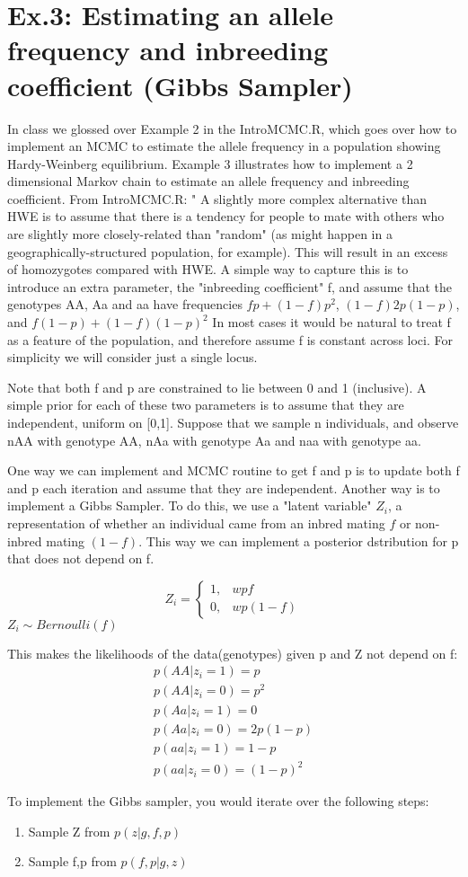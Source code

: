 \documentclass[12pt]{report}
\begin{document}
\section{Ex.3: Estimating an allele frequency and inbreeding coefficient (Gibbs Sampler)}
In class we glossed over Example 2 in the IntroMCMC.R, which goes over how to implement an MCMC to estimate the allele frequency in a population showing Hardy-Weinberg equilibrium.
Example 3 illustrates how to implement a 2 dimensional Markov chain to estimate an allele frequency and inbreeding coefficient.
From IntroMCMC.R:
" A slightly more complex alternative than HWE is to assume that there is a tendency for people to mate with others who are slightly more closely-related than "random" (as might
happen in a geographically-structured population, for example). This will result in an excess of homozygotes compared with
HWE. A simple way to capture this is to introduce an extra parameter,
the "inbreeding coefficient" f, and assume that the genotypes AA, Aa and aa have frequencies $fp + \left ( 1-f\right )p^2$, $\left (1-f \right ) 2p\left (1-p\right )$, and $f\left (1-p \right) + \left(1-f\right )\left (1-p\right)^2$
In most cases it would be natural to treat f as a feature of
the population, and therefore assume f is constant across loci. For simplicity we will consider just a single locus.

Note that both f and p are constrained to lie between 0 and 1 (inclusive). A simple prior for each of these two parameters is to assume
that they are independent, uniform on [0,1]. Suppose that we sample n individuals, and observe nAA with genotype AA,
nAa with genotype Aa and naa with genotype aa.

One way we can implement and MCMC routine to get f and p is to update both f and p each iteration and assume that they are independent. Another way is to implement a Gibbs Sampler. 
To do this, we use a "latent variable" $Z_i$, a representation of whether an individual came from an inbred mating $f$ or non-inbred mating $(1-f)$. This way we can implement a posterior dstribution for p that does not depend on f.


\begin{equation}
    Z_i =
    \begin{cases}
    1, & wpf \\
    0, & wp\left(1-f \right)
    \end{cases}
\end{equation}
$Z_i \sim Bernoulli\left (f \right )$

This makes the likelihoods of the data(genotypes) given p and Z not depend on f:
\begin{eqnarray}
p\left (AA|z_i = 1 \right ) = p \\
%
p\left (AA|z_i = 0 \right ) = p^2 \\
%
p\left (Aa|z_i = 1 \right ) = 0 \\
%
p\left (Aa|z_i = 0 \right ) = 2p\left (1-p \right )\\
%
p\left (aa|z_i = 1 \right ) = 1-p \\
%
p\left (aa|z_i = 0 \right ) = \left ( 1-p \right )^2
\end{eqnarray}

To implement the Gibbs sampler, you would iterate over the following steps:
\begin{enumerate}
\item Sample Z from $p\left(z| g, f, p\right)$
\item Sample f,p from $p\left(f, p |g, z\right)$
\end{enumerate}
\end{document}
